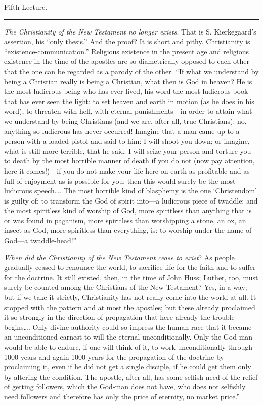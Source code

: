 \documentclass[12pt,a4paper,openany]{book}
\newcommand{\opage}[1]{\marginnote{\footnotesize\textit{[#1]}}}
\newcommand{\lecture}[1]{\clearpage\begin{center}{\large #1}\\[0.4em]\rule{3em}{0.4pt}\end{center}\medskip\noindent}
\begin{document}
\lecture{Fifth Lecture.}
\opage{71}\emph{The Christianity of the New Testament no longer exists}. That is
S. Kierkegaard's assertion, his ``only thesis.'' And the proof? It is
short and pithy. Christianity is ``existence-communication.'' Religious
existence in the present age and religious existence in the time of the
apostles are so diametrically opposed to each other that the one can be
regarded as a parody of the other. ``If what we understand by being a
Christian really is being a Christian, what then is God in heaven? He is
the most ludicrous being who has ever lived, his word the most ludicrous
book that has ever seen the light: to set heaven and earth in motion (as
he does in his word), to threaten with hell, with eternal
punishments---in order to attain what we understand by being Christians
(and we are, after all, true Christians): no, anything so ludicrous has
never occurred! Imagine that a man came up to a person with a loaded
pistol and said to him: I will shoot you down; or imagine, what is still
more terrible, that he said: I will seize your person and torture you to
death by the most horrible manner of death if you do not (now pay
attention, here it comes!)---if you do not make your life here on earth
\opage{72}as profitable and as full of enjoyment as is possible for you: then this
would surely be the most ludicrous speech\dots{}. The most horrible kind
of blasphemy is the one `Christendom' is guilty of: to transform the God
of spirit into---a ludicrous piece of twaddle; and the most spiritless
kind of worship of God, more spiritless than anything that is or was
found in paganism, more spiritless than worshipping a stone, an ox, an
insect as God, more spiritless than everything, is: to worship under the
name of God---a twaddle-head!'' %

\emph{When did the Christianity of the New Testament cease to exist}? As
people gradually ceased to renounce the world, to sacrifice life for the
faith and to suffer for the doctrine. It still existed, then, in the time
of John Huss; Luther, too, must surely be counted among the Christians of
the New Testament? Yes, in a way; but if we take it strictly,
Christianity has not really come into the world at all. It stopped with
the pattern and at most the apostles; but these already proclaimed it so
strongly in the direction of propagation that here already the trouble
begins\dots{}. Only divine authority could so impress the human race that
it became an unconditioned earnest to will the eternal unconditionally.
Only the God-man would be able to endure, if one will think of it, to
work unconditionally through 1000 years and again 1000 years for the
propagation of the doctrine by proclaiming it, even if he did not get a
single disciple, if he could get them only by altering the condition. The
apostle, after all, has some selfish need of the relief of getting
followers, which the God-man does not have, who does not selfishly need
followers and therefore has only the price of eternity, no market
price.'' %
\end{document}
